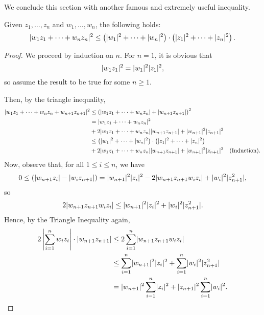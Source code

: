 We conclude this section with another famous and extremely useful inequality.

\begin{theorem}
	\label{thm:cauchy-schwarz}
	Given $z_1,\dots,z_n$ and $w_1,\dots,w_n$, the following holds: $$\lvert w_1z_1+\cdots+w_nz_n \rvert^2 \le \left(\lvert w_1 \rvert^2+\cdots+\lvert w_n \rvert^2\right) \cdot \left(\lvert z_1 \rvert^2+\cdots+\lvert z_n \rvert^2\right).$$
\end{theorem}

\begin{proof}
	We proceed by induction on $n$. For $n=1$, it is obvious that $$\lvert w_1z_1 \rvert^2=\lvert w_1 \rvert^2\lvert z_1 \rvert^2,$$ so assume the result to be true for some $n \ge 1$.
	
	Then, by the triangle inequality,
	\begin{align}
		\lvert w_1z_1+\cdots+w_nz_n+w_{n+1}z_{n+1} \rvert^2 &\le \left(\lvert w_1z_1+\cdots+w_nz_n \rvert+\lvert w_{n+1}z_{n+1} \rvert\right)^2 \nonumber \\
		&=\lvert w_1z_1+\cdots+w_nz_n \rvert^2 \nonumber \\&+2\lvert w_1z_1+\cdots+w_nz_n \rvert\lvert w_{n+1}z_{n+1} \rvert+\lvert w_{n+1} \rvert^2\lvert z_{n+1} \rvert^2 \nonumber \\
		&\le \left(\lvert w_1 \rvert^2+\cdots+\lvert w_n \rvert^2\right) \cdot \left(\lvert z_1 \rvert^2+\cdots+\lvert z_n \rvert^2\right) \nonumber \\&+2\lvert w_1z_1+\cdots+w_nz_n \rvert\lvert w_{n+1}z_{n+1} \rvert+\lvert w_{n+1} \rvert^2\lvert z_{n+1} \rvert^2 & \text{(Induction)}.
	\end{align}
	Now, observe that, for all $1 \le i \le n$, we have $$0 \le \left(\lvert w_{n+1}z_i \rvert-\lvert w_iz_{n+1} \rvert\right)=\lvert w_{n+1} \rvert^2\lvert z_i \rvert^2-2\lvert w_{n+1}z_{n+1}w_iz_i \rvert+\lvert w_i \rvert^2\lvert z_{n+1}^2 \rvert,$$ so $$2\lvert w_{n+1}z_{n+1}w_iz_i \rvert \le \lvert w_{n+1} \rvert^2\lvert z_i \rvert^2+\lvert w_i \rvert^2\lvert z_{n+1}^2 \rvert.$$ Hence, by the Triangle Inequality again,
	\begin{align}
		2\left\lvert \sum_{i=1}^{n}w_iz_i\right \rvert \cdot \lvert w_{n+1}z_{n+1} \rvert &\le 2\sum_{i=1}^{n}\lvert w_{n+1}z_{n+1}w_iz_i \rvert \nonumber \\ &\le \sum_{i=1}^{n}\lvert w_{n+1} \rvert^2\lvert z_i \rvert^2+\sum_{i=1}^{n}\lvert w_i \rvert^2\lvert z_{n+1}^2 \rvert \nonumber \\
		&=\lvert w_{n+1} \rvert^2\sum_{i=1}^{n}\lvert z_i \rvert^2+\lvert z_{n+1} \rvert^2\sum_{i=1}^{n}\lvert w_i \rvert^2.
	\end{align}
	

\end{proof}
